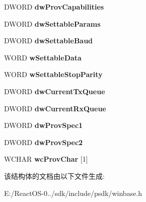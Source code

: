\begin{DoxyCompactItemize}
D\+W\+O\+RD {\bfseries dw\+Prov\+Capabilities}
\item 
\mbox{\label{struct___c_o_m_m_p_r_o_p_a5030e483fcefeda04a939b354b7a856e}} 
D\+W\+O\+RD {\bfseries dw\+Settable\+Params}
\item 
\mbox{\label{struct___c_o_m_m_p_r_o_p_a2456d8626bbc964165fd85a8b8945519}} 
D\+W\+O\+RD {\bfseries dw\+Settable\+Baud}
\item 
\mbox{\label{struct___c_o_m_m_p_r_o_p_a7350ef485b018066fac7f9e9a2c1a9d6}} 
W\+O\+RD {\bfseries w\+Settable\+Data}
\item 
\mbox{\label{struct___c_o_m_m_p_r_o_p_a454f7d1c59e603730d9c06a3b3e309de}} 
W\+O\+RD {\bfseries w\+Settable\+Stop\+Parity}
\item 
\mbox{\label{struct___c_o_m_m_p_r_o_p_aed90b093ce291f5e62949050826e1d30}} 
D\+W\+O\+RD {\bfseries dw\+Current\+Tx\+Queue}
\item 
\mbox{\label{struct___c_o_m_m_p_r_o_p_aa53daac9d8a432f4255aabe8ca614b8f}} 
D\+W\+O\+RD {\bfseries dw\+Current\+Rx\+Queue}
\item 
\mbox{\label{struct___c_o_m_m_p_r_o_p_a4b0b37169723149454fe92f1f64247d8}} 
D\+W\+O\+RD {\bfseries dw\+Prov\+Spec1}
\item 
\mbox{\label{struct___c_o_m_m_p_r_o_p_ae9ea5ebd82c6f966937512353e6ef25a}} 
D\+W\+O\+RD {\bfseries dw\+Prov\+Spec2}
\item 
\mbox{\label{struct___c_o_m_m_p_r_o_p_ae13b40d99e2d90becee52cf28fe60772}} 
W\+C\+H\+AR {\bfseries wc\+Prov\+Char} \mbox{[}1\mbox{]}
\end{DoxyCompactItemize}


该结构体的文档由以下文件生成\+:\begin{DoxyCompactItemize}
\item 
E\+:/\+React\+O\+S-\/0../sdk/include/psdk/winbase.\+h\end{DoxyCompactItemize}

